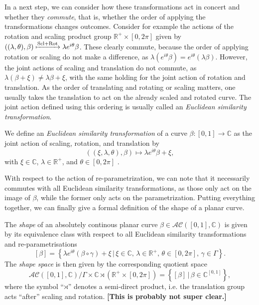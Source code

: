 In a next step, we can consider how these transformations act in concert and whether they \textit{commute}, that is, whether the order of applying the transformations changes outcomes.
Consider for example the actions of the rotation and scaling product group $\mathbb{R}^+ \times [0,2\pi]$ given by $((\lambda, \theta), \beta) \xmapsto{\text{Scl} + \text{Rot}} \lambda e^{i\theta} \beta$.
These clearly commute, because the order of applying rotation or scaling do not make a difference, as $\lambda(e^{i\theta}\beta) = e^{i\theta}(\lambda\beta)$.
However, the joint actions of scaling and translation do not commute, as $\lambda(\beta + \xi) \neq \lambda\beta + \xi$, with the same holding for the joint action of rotation and translation.
As the order of translating and rotating or scaling matters, one usually takes the translation to act on the already scaled and rotated curve.
The joint action defined using this ordering is usually called an \textit{Euclidean similarity transformation}.

\begin{definition} 
  We define an \emph{Euclidean similarity transformation} of a curve $\beta : [0,1] \rightarrow \mathbb{C}$ as the joint action of scaling, rotation, and translation by 
  $$((\xi, \lambda, \theta), \beta) \mapsto \lambda e^{i\theta} \beta + \xi,$$
  with $\xi \in \mathbb{C}$, $\lambda \in \mathbb{R}^+$, and $\theta \in [0,2\pi]$ \parencite[see][62]{DrydenMardia2016}.
\end{definition}

\noindent With respect to the action of re-parametrization, we can note that it necessarily commutes with all Euclidean similarity transformations, as those only act on the image of $\beta$, while the former only acts on the parametrization.
Putting everything together, we can finally give a formal definition of the shape of a planar curve.

\begin{definition}[Shape]
  The \emph{shape} of an absolutely continous planar curve $\beta \in \mathcal{AC}([0,1], \mathbb{C})$ is given by its equivalence class with respect to all Euclidean similarity transformations and re-parametrisations
  $$ [\beta] = \left\{\lambda e^{i\theta}(\beta \circ \gamma) + \xi\,|\, \xi \in \mathbb{C},\, \lambda \in \mathbb{R}^+,\, \theta \in [0,2\pi],\, \gamma \in \Gamma\right\}. $$
  The \emph{shape space} is then given by the corresponding quotient space 
  $$\mathcal{AC}([0,1], \mathbb{C}) \big/ \Gamma \times \mathbb{C} \rtimes \left( \mathbb{R}^+ \times [0,2\pi] \right) = \left\{[\beta]\,|\,\beta \in \mathbb{C}^{[0,1]}\right\},$$
  where the symbol \enquote{$\rtimes$} denotes a semi-direct product, i.e. the translation group acts \enquote{after} scaling and rotation. 
  \textbf{[This is probably not super clear.]}
\end{definition}


